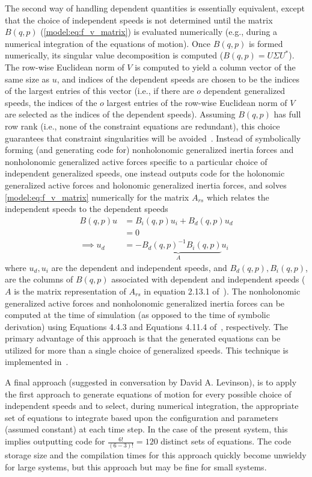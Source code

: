 The second way of handling dependent quantities is essentially equivalent,
except that the choice of independent speeds is not determined until the matrix
$B(q, p)$ (\autoref{model:eq:f_v_matrix}) is evaluated numerically (e.g.,
during a numerical integration of the equations of motion). Once $B(q, p)$ is
formed numerically, its singular value decomposition is computed ($B(q, p) =
U\Sigma U^*$). The row-wise Euclidean norm of $V$ is computed to yield a column
vector of the same size as $u$, and indices of the dependent speeds are chosen
to be the indices of the largest entries of this vector (i.e., if there are $o$
dependent generalized speeds, the indices of the $o$ largest entries of the
row-wise Euclidean norm of $V$ are selected as the indices of the dependent
speeds). Assuming $B(q, p)$ has full row rank (i.e., none of the constraint
equations are redundant), this choice guarantees that constraint singularities
will be avoided~\cite{Reckdahl1996}. Instead of symbolically forming (and
generating code for) nonholonomic generalized inertia forces and nonholonomic
generalized active forces specific to a particular choice of independent
generalized speeds, one instead outputs code for the holonomic generalized
active forces and holonomic generalized inertia forces, and solves
\autoref{model:eq:f_v_matrix} numerically for the matrix $A_{rs}$ which relates
the independent speeds to the dependent speeds
\begin{align}
  B(q, p) u &= B_i(q, p) u_i + B_d(q, p) u_d \\
            &= 0 \\
\implies u_d &= \underbrace{-B_d(q, p)^{-1} B_i(q, p)}_{A} u_i
\end{align}
where $u_d, u_i$ are the dependent and independent speeds, and $B_d(q,p),
B_i(q,p)$, are the columns of $B(q, p)$ associated with dependent and
independent speeds ($A$ is the matrix representation of $A_{rs}$ in equation
2.13.1 of~\cite{Kane1985}). The nonholonomic generalized active forces and
nonholonomic generalized inertia forces can be computed at the time of
simulation (as opposed to the time of symbolic derivation) using Equations
4.4.3 and Equations 4.11.4 of~\cite{Kane1985}, respectively. The primary
advantage of this approach is that the generated equations can be utilized for
more than a single choice of generalized speeds. This technique is implemented
in~\cite{libbicycle}.

A final approach (suggested in conversation by David A. Levinson), is to apply
the first approach to generate equations of motion for every possible choice of
independent speeds and to select, during numerical integration, the appropriate
set of equations to integrate based upon the configuration and parameters
(assumed constant) at each time step. In the case of the present system, this
implies outputting code for $\frac{6!}{(6-3)!}=120$ distinct sets of equations.
The code storage size and the compilation times for this approach quickly
become unwieldy for large systems, but this approach but may be fine for small
systems.

